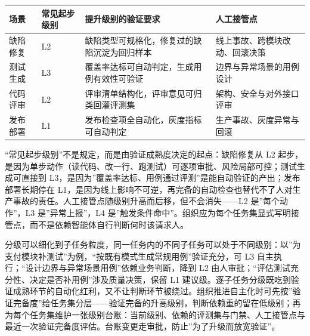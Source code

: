 \documentclass[12pt,a4paper,twoside,openany]{ctexbook}
\numberwithin{figure}{chapter}
\numberwithin{table}{chapter}
\newcounter{none}
\begin{document}
{\def\LTcaptype{none} %
\begin{longtable}[]{@{}
  >{\raggedright\arraybackslash}p{}
  >{\raggedright\arraybackslash}p{}
  >{\raggedright\arraybackslash}p{}
  >{\raggedright\arraybackslash}p{}@{}}
\toprule\noalign{}
\begin{minipage}[b]{\linewidth}\raggedright
场景
\end{minipage} & \begin{minipage}[b]{\linewidth}\raggedright
常见起步级别
\end{minipage} & \begin{minipage}[b]{\linewidth}\raggedright
提升级别的验证要求
\end{minipage} & \begin{minipage}[b]{\linewidth}\raggedright
人工接管点
\end{minipage} \\
\midrule\noalign{}
\endhead
\bottomrule\noalign{}
\endlastfoot
缺陷修复 & L2 & 缺陷类型可规格化，修复过的缺陷沉淀为回归样本 &
线上事故、跨模块改动、回滚决策 \\
测试生成 & L3 & 覆盖率达标可自动判定，生成用例有效性可验证 &
边界与异常场景的用例设计 \\
代码评审 & L2 & 评审清单结构化，评审意见可归类回灌评测集 &
架构、安全与对外接口评审 \\
发布部署 & L1 & 发布检查项全自动化，灰度指标可自动判定 &
生产事故、灰度异常与回滚 \\
\end{longtable}
}

``常见起步级别''不是规定，而是由验证成熟度决定的起点：缺陷修复从 L2
起步，是因为单步动作（读代码、改一行、跑测试）可逐项审批、风险局部可控；测试生成可直接到
L3，是因为''覆盖率达标、用例通过评测''是能自动验证的产出；发布部署长期停在
L1，是因为线上影响不可逆，再完备的自动检查也替代不了人对生产事故的责任。人工接管点随级别升高而后移，但不会消失------L2
是''每个动作''，L3 是''异常上报''，L4
是''触发条件命中''。组织应为每个任务集显式写明接管点，而不是依赖智能体自行判断何时该请求人。

分级可以细化到子任务粒度，同一任务内的不同子任务可以处于不同级别：以''为支付模块补测试''为例，``按既有模式生成常规用例''验证充分，可
L3 自主执行；``设计边界与异常场景用例''依赖业务判断，降到 L2
由人审批；``评估测试充分性、决定是否补用例''涉及质量决策，保留 L1
建议级。逐子任务分级既吃到验证成熟环节的自动化红利，又不让判断环节被绕过。组织推进自主化时可先按''验证完备度''给任务集分层------验证完备的升高级别，判断依赖重的留在低级别；再为每个任务集维护一张级别台账：当前级别、依赖的评测集与门禁、人工接管点与最近一次验证完备度评估。台账变更走审批，防止''为了升级而放宽验证''。
\end{document}
